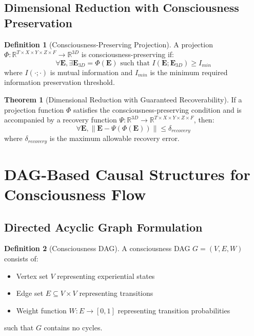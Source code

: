 \documentclass[11pt]{article}
\theoremstyle{definition}
\newtheorem{definition}{Definition}
\newtheorem{theorem}{Theorem}
\begin{document}
\subsection{Dimensional Reduction with Consciousness Preservation}

\begin{definition}[Consciousness-Preserving Projection]
A projection $\Phi: \mathbb{R}^{T \times X \times Y \times Z \times F} \rightarrow \mathbb{R}^{3D}$ is consciousness-preserving if:
\begin{equation}
\forall \mathbf{E}, \exists \mathbf{E}_{3D} = \Phi(\mathbf{E}) \text{ such that } I(\mathbf{E}; \mathbf{E}_{3D}) \geq I_{min}
\end{equation}
where $I(\cdot;\cdot)$ is mutual information and $I_{min}$ is the minimum required information preservation threshold.
\end{definition}

\begin{theorem}[Dimensional Reduction with Guaranteed Recoverability]
If a projection function $\Phi$ satisfies the consciousness-preserving condition and is accompanied by a recovery function $\Psi: \mathbb{R}^{3D} \rightarrow \mathbb{R}^{T \times X \times Y \times Z \times F}$, then:
\begin{equation}
\forall \mathbf{E}, \| \mathbf{E} - \Psi(\Phi(\mathbf{E})) \| \leq \delta_{recovery}
\end{equation}
where $\delta_{recovery}$ is the maximum allowable recovery error.
\end{theorem}

\section{DAG-Based Causal Structures for Consciousness Flow}

\subsection{Directed Acyclic Graph Formulation}

\begin{definition}[Consciousness DAG]
A consciousness DAG $G = (V, E, W)$ consists of:
\begin{itemize}
    \item Vertex set $V$ representing experiential states
    \item Edge set $E \subseteq V \times V$ representing transitions
    \item Weight function $W: E \rightarrow [0,1]$ representing transition probabilities
\end{itemize}
such that $G$ contains no cycles.
\end{definition}
\end{document}
